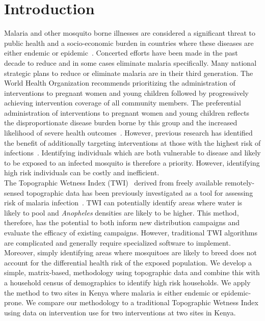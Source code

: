 \documentclass[10pt,letterpaper]{article}\usepackage[]{graphicx}\usepackage[]{color}
\begin{document}
\linenumbers

\section*{Introduction}
Malaria and other mosquito borne illnesses are considered a significant threat to public health and a socio-economic burden in countries where these diseases are either endemic or epidemic~\cite{Crouch}. Concerted efforts have been made in the past decade to reduce and in some cases eliminate malaria specifically. Many national strategic plans to reduce or eliminate malaria are in their third generation.  The World Health Organization recommends prioritizing the administration of interventions to pregnant women and young children followed by progressively achieving intervention coverage of all community members. The preferential administration of interventions to pregnant women and young children reflects the disproportionate disease burden borne by this group and the increased likelihood of severe health outcomes~\cite{Bousema2012}. However,  previous research has identified the benefit of additionally targeting interventions at those with the highest risk of infections~\cite{SchantzDunn2009}. Identifying individuals which are both vulnerable to disease and likely to be exposed to an infected mosquito is therefore a priority.  However, identifying high risk individuals can be costly and inefficient.\\

The Topographic Wetness Index (TWI)~\cite{Beven1979} derived from freely available remotely-sensed topographic data has been previously investigated as a tool for assessing risk of malaria infection~\cite{Cohen2008, Cohen2010}. TWI can potentially identify areas where water is likely to pool and \emph{Anopheles} densities are likely to be higher. This method, therefore, has the potential to both inform new distribution campaigns and evaluate the efficacy of existing campaigns.  However, traditional TWI algorithms are complicated and generally require specialized software to implement.  Moreover, simply identifying areas where mosquitoes are likely to breed does not account for the differential health risk of the exposed population.  We develop a simple, matrix-based, methodology using topographic data and combine this with a household census of demographics to identify high risk households.  We apply the method to two sites in Kenya where malaria is either endemic or epidemic-prone.  We compare our methodology to a traditional Topographic  Wetness Index using data on intervention use for two interventions at two sites in Kenya. \\%
\end{document}
